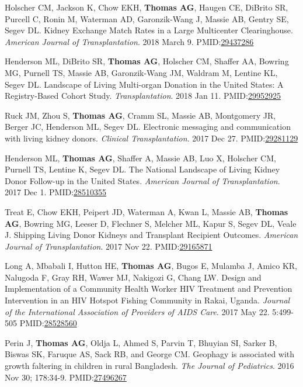 \documentclass[10pt]{article}
\makeatletter
\newlength{\bibhang}
\newlength{\bibsep}
 {\@listi \global\bibsep\itemsep \global\advance\bibsep by\parsep}
\newenvironment{bibenum*}
  {\renewcommand\labelenumi{[\theenumi]}%
   \etaremune[
     topsep=0pt,
     itemsep=\bibsep,
     parsep=0pt,partopsep=0pt,
     itemindent=-\bibhang,
     leftmargin={\bibhang+\widthof{[999]}}]}
  {\endetaremune}
\newcommand{\pmid}[1]{PMID:\href{https://www.ncbi.nlm.nih.gov/pubmed/#1}{#1}}
\makeatother
\begin{document}
\begin{bibenum*}
\item Holscher CM, Jackson K, Chow EKH, \textbf{Thomas AG}, Haugen CE,
  DiBrito SR, Purcell C, Ronin M, Waterman AD, Garonzik-Wang J, Massie AB,
  Gentry SE, Segev DL. Kidney Exchange Match Rates in a Large
  Multicenter Clearinghouse.
  \emph{American Journal of Transplantation}. 2018 March 9.
  \pmid{29437286} 

\item Henderson ML\dag, DiBrito SR\dag, \textbf{Thomas AG}, Holscher CM,
  Shaffer AA, Bowring MG, Purnell TS, Massie AB, Garonzik-Wang JM,
  Waldram M, Lentine KL, Segev DL.  Landscape of Living Multi-organ
  Donation in the United States: A Registry-Based Cohort Study.
  \emph{Transplantation}. 2018 Jan 11.
  \pmid{29952925} 

\item Ruck JM, Zhou S, \textbf{Thomas AG}, Cramm SL, Massie AB,
  Montgomery JR, Berger JC, Henderson ML, Segev DL.
  Electronic messaging and communication with living kidney donors.
  \emph{Clinical Transplantation}. 2017 Dec 27.
  \pmid{29281129} 

\item Henderson ML\dag, \textbf{Thomas AG\dag}, Shaffer A, Massie AB, Luo X,
  Holscher CM, Purnell TS, Lentine K, Segev DL. The National Landscape
  of Living Kidney Donor Follow-up in the United States.
  \emph{American Journal of Transplantation}. 2017 Dec 1.
  \pmid{28510355} 

\item Treat E, Chow EKH, Peipert JD, Waterman A, Kwan L, Massie AB,
  \textbf{Thomas AG}, Bowring MG, Leeser D, Flechner S, Melcher ML, Kapur S,
  Segev DL, Veale J. Shipping Living Donor Kidneys and Transplant Recipient
  Outcomes.
  \emph{American Journal of Transplantation}. 2017 Nov 22.
  \pmid{29165871} 

\item Long A, Mbabali I, Hutton HE, \textbf{Thomas AG}, Bugos E,
  Mulamba J, Amico KR, Nalugoda F, Gray RH,
  Wawer MJ, Nakigozi G, Chang LW.
  Design and Implementation of a Community Health Worker HIV
  Treatment and Prevention Intervention in an HIV Hotspot
  Fishing Community in Rakai, Uganda. \emph{Journal of the International
  Association of Providers of AIDS Care}. 2017 May 22. 5:499-505
  \pmid{28528560} \\ 

\item Perin J, \textbf{Thomas AG}, Oldja L, Ahmed S, Parvin T,
  Bhuyian SI, Sarker B, Biswas SK, Faruque AS,
  Sack RB, and George CM. Geophagy is associated with growth
  faltering in children in rural Bangladesh.
  \emph{The Journal of Pediatrics}. 2016 Nov 30; 178:34-9.
  \pmid{27496267} 

\end{bibenum*}
\end{document}

